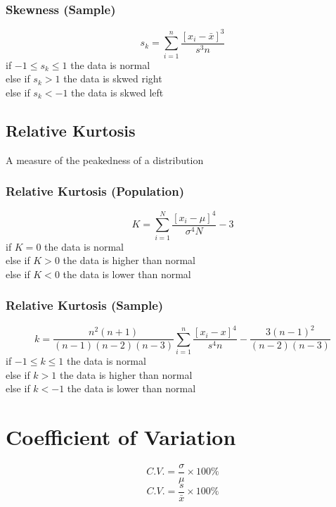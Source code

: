 \documentclass[twocolumn]{article}
\begin{document}
\subsubsection{Skewness (Sample)}
\begin{equation}
    s_{k} = \sum_{i=1}^{n}\frac{[x_{i} - \bar{x}]^{3}}{s^{3}n}
\end{equation}
if $-1 \leq s_{k} \leq 1$ the data is normal\\
else if $s_{k} > 1$ the data is skwed right\\
else if $s_{k} < -1$ the data is skwed left
\subsection{Relative Kurtosis}
A measure of the peakedness of a distribution
\subsubsection{Relative Kurtosis (Population)}
\begin{equation}
    K = \sum_{i=1}^{N}\frac{[x_{i} - \mu]^{4}}{\sigma^{4}N} - 3
\end{equation}
if $K = 0$ the data is normal\\
else if $K > 0$ the data is higher than normal\\
else if $K < 0$ the data is lower than normal
\subsubsection{Relative Kurtosis (Sample)}
\tiny
\begin{equation}
    k = \frac{n^{2}(n+1)}{(n-1)(n-2)(n-3)} \sum_{i=1}^{n}\frac{[x_{i}-x]^{4}}{s^{4}n}-\frac{3(n-1)^{2}}{(n-2)(n-3)}
\end{equation}
\normalsize
if $-1 \leq k \leq 1$ the data is normal\\
else if $k > 1$ the data is higher than normal\\
else if $k < -1$ the data is lower than normal
\section{Coefficient of Variation}
\begin{equation}
    C.V. = \frac{\sigma}{\mu} \times 100\%
\end{equation}
\begin{equation}
    C.V. = \frac{s}{\bar{x}} \times 100\%
\end{equation}
\end{document}
